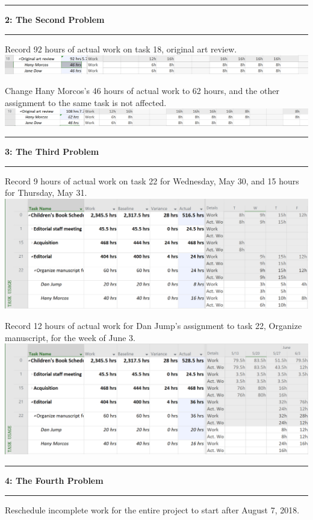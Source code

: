 \documentclass[11pt]{article}
\newcommand\question[2]{\vspace{.25in}\hrule\textbf{#1: #2}\vspace{.5em}\hrule\vspace{.10in}}
\begin{document}
\question{2}{The Second Problem}

Record 92 hours of actual work on task 18, original art review.\\
\includegraphics[scale=0.45]{p2-1.png}

Change Hany Morcos’s 46 hours of actual work to 62 hours, and the other assignment to the same task is not affected.\\
\includegraphics[scale=0.43]{p2-2.png}


\question{3}{The Third Problem}

Record 9 hours of actual work on task 22 for Wednesday, May 30, and 15 hours for Thursday, May 31.\\
\includegraphics[scale=0.5]{p3-1.png}

Record 12 hours of actual work for Dan Jump’s assignment to task 22, Organize manuscript, for the week of June 3.\\
\includegraphics[scale=0.5]{p3-2.png}


\question{4}{The Fourth Problem}

Reschedule incomplete work for the entire project to start after August 7, 2018.\\
\end{document}
